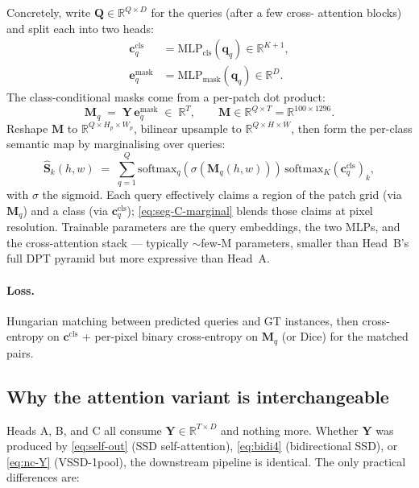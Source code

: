 \documentclass[11pt,a4paper]{article}
\begin{document}
Concretely, write
$\bm{Q}\in\mathbb{R}^{Q\times D}$ for the queries (after a few cross-
attention blocks) and split each into two heads:
\begin{align}
  \bm{c}_q^{\text{cls}} &= \mathrm{MLP}_{\text{cls}}(\bm{q}_q)\in\mathbb{R}^{K+1}, \\
  \bm{e}_q^{\text{mask}} &= \mathrm{MLP}_{\text{mask}}(\bm{q}_q)\in\mathbb{R}^{D}.
\end{align}
The class-conditional masks come from a per-patch dot product:
\begin{equation}
  \bm{M}_q \;=\; \bm{Y}\,\bm{e}_q^{\text{mask}}
   \;\in\;\mathbb{R}^{T},
  \qquad
  \bm{M}\in\mathbb{R}^{Q\times T}=\mathbb{R}^{100\times 1296}.
\end{equation}
Reshape $\bm{M}$ to $\mathbb{R}^{Q\times H_p\times W_p}$, bilinear
upsample to $\mathbb{R}^{Q\times H\times W}$, then form the per-class
semantic map by marginalising over queries:
\begin{equation}\label{eq:seg-C-marginal}
  \widehat{\bm{S}}_k(h,w)
   \;=\; \sum_{q=1}^{Q}
         \mathrm{softmax}_q(\sigma(\bm{M}_q(h,w)))\,
         \mathrm{softmax}_K(\bm{c}_q^{\text{cls}})_k,
\end{equation}
with $\sigma$ the sigmoid. Each query effectively claims a region of
the patch grid (via $\bm{M}_q$) and a class (via $\bm{c}_q^{\text{cls}}$);
\eqref{eq:seg-C-marginal} blends those claims at pixel resolution.
Trainable parameters are the query embeddings, the two MLPs, and
the cross-attention stack — typically $\sim$few-M parameters, smaller
than Head~B's full DPT pyramid but more expressive than Head~A.

\paragraph{Loss.} Hungarian matching between predicted queries and GT
instances, then cross-entropy on $\bm{c}^{\text{cls}}$ + per-pixel
binary cross-entropy on $\bm{M}_q$ (or Dice) for the matched pairs.

\subsection{Why the attention variant is interchangeable}

Heads A, B, and C all consume $\bm{Y}\in\mathbb{R}^{T\times D}$ and
nothing more. Whether $\bm{Y}$ was produced by
\eqref{eq:self-out} (SSD self-attention), \eqref{eq:bidi4}
(bidirectional SSD), or \eqref{eq:nc-Y} (VSSD-1pool), the
downstream pipeline is identical. The only practical differences are:
\end{document}
